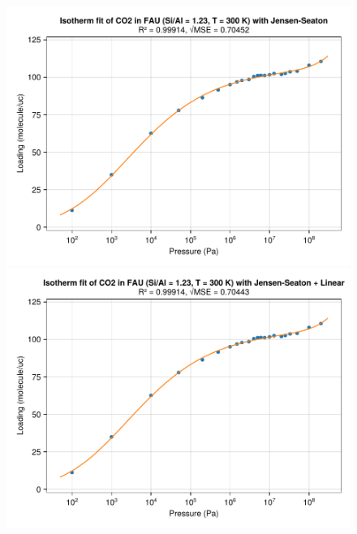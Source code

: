 \documentclass[main.tex]{subfiles}
\begin{document}
\begin{figure}
	\begin{minipage}{0.49\columnwidth}
		\includegraphics[width=\columnwidth]{figures/isotherms/Jensen-Seaton.pdf}
	\end{minipage}\hfill%
	\begin{minipage}{0.49\columnwidth}
		\includegraphics[width=\columnwidth]{figures/isotherms/Jensen-Seaton + Linear.pdf}
	\end{minipage}
	

\end{figure}
\end{document}

